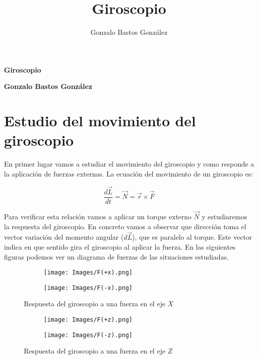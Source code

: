 \documentclass[a4paper,12pt,titlepage]{article}
\title{Giroscopio}
\author{Gonzalo Bastos González}
\begin{document}
\begin{center}
    \textbf{\Large Giroscopio}
\end{center}

\begin{center}
    \textbf{Gonzalo Bastos González}
\end{center}

\section{Estudio del movimiento del giroscopio}

En primer lugar vamos a estudiar el movimiento del giroscopio y como responde a la aplicación de fuerzas externas. La ecuación del movimiento de un giroscopio es:

\begin{equation}
    \frac{d\vec{L}}{dt} = \vec{N} = \vec{r}\times\vec{F}
    \label{Ec movimiento}
\end{equation}

Para verificar esta relación vamos a aplicar un torque externo $\vec{N}$ y estudiaremos la respuesta del giroscopio. En concreto vamos a observar que dirección toma el vector variación del momento angular ($d\vec{L}$), que es paralelo al torque. Este vector indica en que sentido gira el giroscopio al aplicar la fuerza. En las siguientes figuras podemos ver un diagrama de fuerzas de las situaciones estudiadas.

\begin{figure}[h!]
    \centering
    \begin{subfigure}{0.45\textwidth}
        \centering
        \texttt{[image: Images/F(+x).png]}
    \end{subfigure}
    \begin{subfigure}{0.45\textwidth}
        \centering
        \texttt{[image: Images/F(-x).png]}
    \end{subfigure}
    \caption{Respuesta del giroscopio a una fuerza en el eje $X$}
\end{figure}

\begin{figure}[h!]
    \centering
    \begin{subfigure}{0.45\textwidth}
        \centering
        \texttt{[image: Images/F(+z).png]}
    \end{subfigure}
    \begin{subfigure}{0.45\textwidth}
        \centering
        \texttt{[image: Images/F(-z).png]}
    \end{subfigure}
    \caption{Respuesta del giroscopio a una fuerza en el eje $Z$}
\end{figure}
\end{document}
